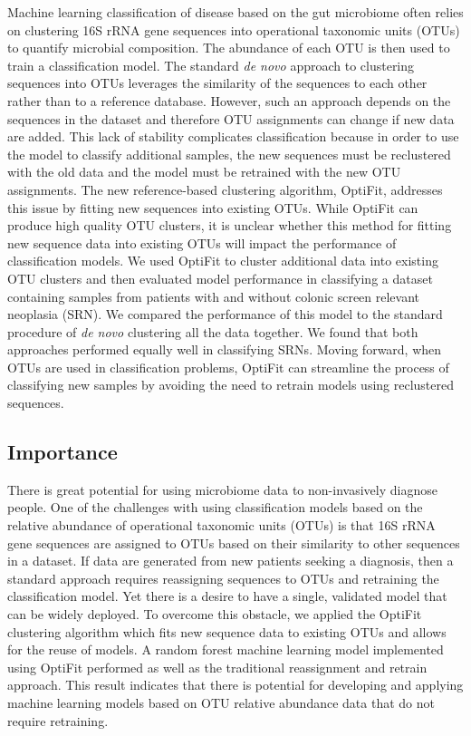 \documentclass[
]{article}
\begin{document}
Machine learning classification of disease based on the gut microbiome
often relies on clustering 16S rRNA gene sequences into operational
taxonomic units (OTUs) to quantify microbial composition. The abundance
of each OTU is then used to train a classification model. The standard
\emph{de novo} approach to clustering sequences into OTUs leverages the
similarity of the sequences to each other rather than to a reference
database. However, such an approach depends on the sequences in the
dataset and therefore OTU assignments can change if new data are added.
This lack of stability complicates classification because in order to
use the model to classify additional samples, the new sequences must be
reclustered with the old data and the model must be retrained with the
new OTU assignments. The new reference-based clustering algorithm,
OptiFit, addresses this issue by fitting new sequences into existing
OTUs. While OptiFit can produce high quality OTU clusters, it is unclear
whether this method for fitting new sequence data into existing OTUs
will impact the performance of classification models. We used OptiFit to
cluster additional data into existing OTU clusters and then evaluated
model performance in classifying a dataset containing samples from
patients with and without colonic screen relevant neoplasia (SRN). We
compared the performance of this model to the standard procedure of
\emph{de novo} clustering all the data together. We found that both
approaches performed equally well in classifying SRNs. Moving forward,
when OTUs are used in classification problems, OptiFit can streamline
the process of classifying new samples by avoiding the need to retrain
models using reclustered sequences.

\hypertarget{importance}{%
\subsection{Importance}\label{importance}}

There is great potential for using microbiome data to non-invasively
diagnose people. One of the challenges with using classification models
based on the relative abundance of operational taxonomic units (OTUs) is
that 16S rRNA gene sequences are assigned to OTUs based on their
similarity to other sequences in a dataset. If data are generated from
new patients seeking a diagnosis, then a standard approach requires
reassigning sequences to OTUs and retraining the classification model.
Yet there is a desire to have a single, validated model that can be
widely deployed. To overcome this obstacle, we applied the OptiFit
clustering algorithm which fits new sequence data to existing OTUs and
allows for the reuse of models. A random forest machine learning model
implemented using OptiFit performed as well as the traditional
reassignment and retrain approach. This result indicates that there is
potential for developing and applying machine learning models based on
OTU relative abundance data that do not require retraining.
\end{document}
